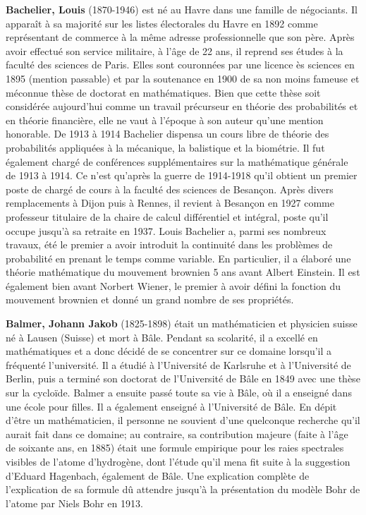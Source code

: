 \pichskip{15pt}%
\textbf{Bachelier, Louis} (1870-1946) est né au Havre dans une famille de négociants. Il apparaît à sa majorité sur les listes électorales du Havre en 1892 comme représentant de commerce à la même adresse professionnelle que son père. Après avoir effectué son service militaire, à l'âge de 22 ans, il reprend ses études à la faculté des sciences de Paris. Elles sont couronnées par une licence ès sciences en 1895 (mention passable) et par la soutenance en 1900 de sa non moins fameuse et méconnue thèse de doctorat en mathématiques. Bien que cette thèse soit considérée aujourd'hui comme un travail précurseur en théorie des probabilités et en théorie financière, elle ne vaut à l'époque à son auteur qu'une mention honorable. De 1913 à 1914 Bachelier dispensa un cours libre de théorie des probabilités appliquées à la mécanique, la balistique et la biométrie. Il fut également chargé de conférences supplémentaires sur la mathématique générale de 1913 à 1914.  Ce n'est qu'après la guerre de 1914-1918 qu'il obtient un premier poste de chargé de cours à la faculté des sciences de Besançon. Après divers remplacements à Dijon puis à Rennes, il revient à Besançon en 1927 comme professeur titulaire de la chaire de calcul différentiel et intégral, poste qu'il occupe jusqu'à sa retraite en 1937. Louis Bachelier a, parmi ses nombreux travaux, été le premier a avoir introduit la continuité dans les problèmes de probabilité en prenant le temps comme variable. En particulier, il a élaboré une théorie mathématique du mouvement brownien 5 ans avant Albert Einstein. Il est également bien avant Norbert Wiener, le premier à avoir défini la fonction du mouvement brownien et donné un grand nombre de ses propriétés.

\textbf{Balmer, Johann Jakob} (1825-1898) était un mathématicien et physicien suisse né à Lausen (Suisse) et mort à Bâle. Pendant sa scolarité, il a excellé en mathématiques et a donc décidé de se concentrer sur ce domaine lorsqu'il a fréquenté l'université. Il a étudié à l'Université de Karlsruhe et à l'Université de Berlin, puis a terminé son doctorat de l'Université de Bâle en 1849 avec une thèse sur la cycloïde. Balmer a ensuite passé toute sa vie à Bâle, où il a enseigné dans une école pour filles. Il a également enseigné à l'Université de Bâle. En dépit d'être un mathématicien, il personne ne souvient d'une quelconque recherche qu'il aurait fait dans ce domaine; au contraire, sa contribution majeure (faite à l'âge de soixante ans, en 1885) était une formule empirique pour les raies spectrales visibles de l'atome d'hydrogène, dont l'étude qu'il mena fit suite à la suggestion d'Eduard Hagenbach, également de Bâle. Une explication complète de l'explication de sa formule dû attendre jusqu'à la présentation du modèle Bohr de l'atome par Niels Bohr en 1913.

